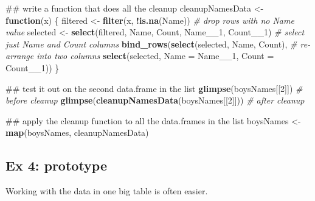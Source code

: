 \documentclass[]{book}
\newenvironment{Shaded}{\begin{snugshade}}{\end{snugshade}}
\newcommand{\KeywordTok}[1]{\textcolor[rgb]{0.13,0.29,0.53}{\textbf{#1}}}
\newcommand{\DataTypeTok}[1]{\textcolor[rgb]{0.13,0.29,0.53}{#1}}
\newcommand{\DecValTok}[1]{\textcolor[rgb]{0.00,0.00,0.81}{#1}}
\newcommand{\StringTok}[1]{\textcolor[rgb]{0.31,0.60,0.02}{#1}}
\newcommand{\CommentTok}[1]{\textcolor[rgb]{0.56,0.35,0.01}{\textit{#1}}}
\newcommand{\ControlFlowTok}[1]{\textcolor[rgb]{0.13,0.29,0.53}{\textbf{#1}}}
\newcommand{\OperatorTok}[1]{\textcolor[rgb]{0.81,0.36,0.00}{\textbf{#1}}}
\newcommand{\NormalTok}[1]{#1}
\begin{document}
\begin{Shaded}
\begin{Highlighting}[]
\NormalTok{## write a function that does all the cleanup}
\NormalTok{cleanupNamesData <-}\StringTok{ }\ControlFlowTok{function}\NormalTok{(x) \{}
\NormalTok{    filtered <-}\StringTok{ }\KeywordTok{filter}\NormalTok{(x, }\OperatorTok{!}\KeywordTok{is.na}\NormalTok{(Name)) }\CommentTok{# drop rows with no Name value}
\NormalTok{    selected <-}\StringTok{ }\KeywordTok{select}\NormalTok{(filtered, Name, Count, Name__}\DecValTok{1}\NormalTok{, Count__}\DecValTok{1}\NormalTok{) }\CommentTok{# select just Name and Count columns}
    \KeywordTok{bind_rows}\NormalTok{(}\KeywordTok{select}\NormalTok{(selected, Name,  Count), }\CommentTok{# re-arrange into two columns}
              \KeywordTok{select}\NormalTok{(selected, }\DataTypeTok{Name =}\NormalTok{ Name__}\DecValTok{1}\NormalTok{, }\DataTypeTok{Count =}\NormalTok{ Count__}\DecValTok{1}\NormalTok{))}
\NormalTok{\}}

\NormalTok{## test it out on the second data.frame in the list}
\KeywordTok{glimpse}\NormalTok{(boysNames[[}\DecValTok{2}\NormalTok{]]) }\CommentTok{# before cleanup}
\KeywordTok{glimpse}\NormalTok{(}\KeywordTok{cleanupNamesData}\NormalTok{(boysNames[[}\DecValTok{2}\NormalTok{]])) }\CommentTok{# after cleanup}

\NormalTok{## apply the cleanup function to all the data.frames in the list}
\NormalTok{boysNames <-}\StringTok{ }\KeywordTok{map}\NormalTok{(boysNames, cleanupNamesData)}
\end{Highlighting}
\end{Shaded}

\subsection{Ex 4: prototype}\label{ex-4-prototype-1}

Working with the data in one big table is often easier.
\end{document}
